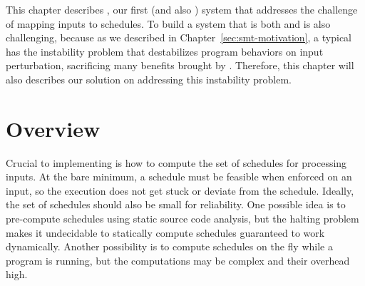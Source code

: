This chapter describes \tern, our first \smt (and also \dmt) system that
addresses the challenge of mapping inputs to schedules. To build a system that
is both \smt and \dmt is also challenging, because as we described in
Chapter~\ref{sec:smt-motivation}, a typical \dmt has the instability problem
that destabilizes program behaviors on input perturbation, sacrificing many
benefits brought by \smt. Therefore, this chapter will also describes our
solution on addressing this instability problem.

\section{Overview} \label{sec:tern-overview}

Crucial to implementing \smt is how to compute the set of schedules for
processing inputs.  At the bare minimum, a schedule must be feasible when
enforced on an input, so the execution does not get stuck or deviate from
the schedule.  Ideally, the set of schedules should also be small for
reliability.  One possible idea is to pre-compute schedules using static
source code analysis, but the halting problem makes it undecidable to
statically compute schedules guaranteed to work dynamically.  Another
possibility is to compute schedules on the fly while a program is running,
but the computations may be complex and their overhead high.






